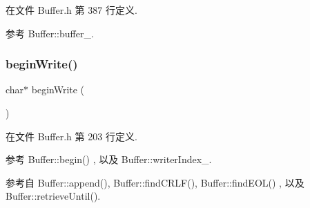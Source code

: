 在文件 Buffer.\+h 第 387 行定义.



参考 Buffer\+::buffer\+\_\+.

\mbox{\label{classmuduo_1_1net_1_1Buffer_a71778facb9cd13bc2403edf59621f3f5}} 
\subsubsection{\texorpdfstring{begin\+Write()}{beginWrite()}\hspace{0.1cm}{\footnotesize\ttfamily [1/2]}}
{\footnotesize\ttfamily char$\ast$ begin\+Write (\begin{DoxyParamCaption}{ }\end{DoxyParamCaption})\hspace{0.3cm}{\ttfamily [inline]}}



在文件 Buffer.\+h 第 203 行定义.



参考 Buffer\+::begin() , 以及 Buffer\+::writer\+Index\+\_\+.



参考自 Buffer\+::append(), Buffer\+::find\+C\+R\+L\+F(), Buffer\+::find\+E\+O\+L() , 以及 Buffer\+::retrieve\+Until().

